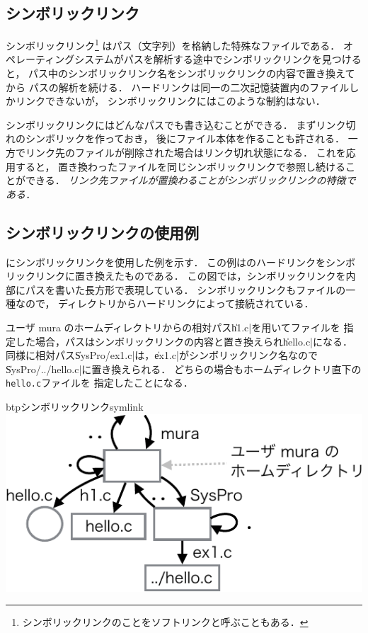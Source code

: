 

\subsection{シンボリックリンク}
シンボリックリンク\footnote{
シンボリックリンクのことをソフトリンクと呼ぶこともある．}
はパス（文字列）を格納した特殊なファイルである．
オペレーティングシステムがパスを解析する途中でシンボリックリンクを見つけると，
パス中のシンボリックリンク名をシンボリックリンクの内容で置き換えてから
パスの解析を続ける．
ハードリンクは同一の二次記憶装置内のファイルしかリンクできないが，
シンボリックリンクにはこのような制約はない．

シンボリックリンクにはどんなパスでも書き込むことができる．
まずリンク切れのシンボリックを作っておき，
後にファイル本体を作ることも許される．
一方でリンク先のファイルが削除された場合はリンク切れ状態になる．
これを応用すると，
置き換わったファイルを同じシンボリックリンクで参照し続けることができる．
\emph{リンク先ファイルが置換わることがシンボリックリンクの特徴である．}

\subsection*{シンボリックリンクの使用例}
にシンボリックリンクを使用した例を示す．
この例はのハードリンクをシンボリックリンクに置き換えたものである．
この図では，シンボリックリンクを内部にパスを書いた長方形で表現している．
シンボリックリンクもファイルの一種なので，
ディレクトリからハードリンクによって接続されている．

ユーザ mura のホームディレクトリからの相対パス\|h1.c|を用いてファイルを
指定した場合，パスはシンボリックリンクの内容と置き換えられ\|hello.c|になる．
同様に相対パス\|SysPro/ex1.c|は，\|ex1.c|がシンボリックリンク名なので
\|SysPro/../hello.c|に置き換えられる．
どちらの場合もホームディレクトリ直下の\texttt{hello.c}ファイルを
指定したことになる．

\begin{myfig}{btp}{シンボリックリンク}{symlink}
\includegraphics[scale=1.0]{Fig/SymLink-crop.pdf}
\end{myfig}

